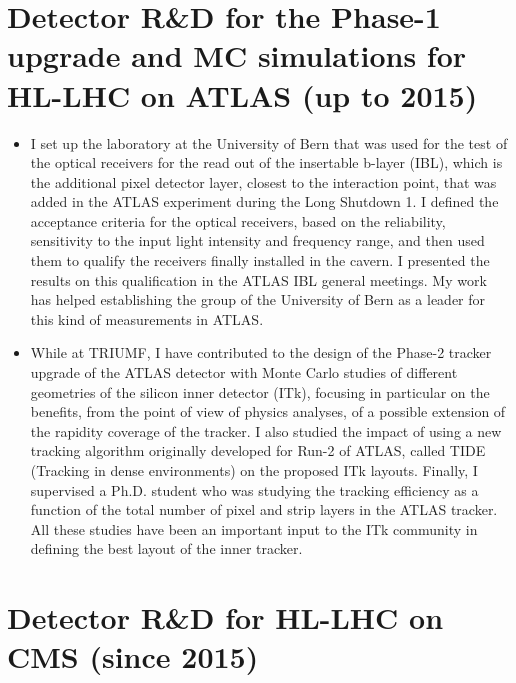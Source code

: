 \documentclass[]{cv} %
\begin{document}
\begin{resume}
\vspace{12pt}
\section{Detector R\&D for the Phase-1 upgrade and MC simulations for HL-LHC on
ATLAS (up to 2015)}

\begin{itemize}
  \item I set up the laboratory at the University of Bern that was used for the
        test of the optical receivers for the read out of the insertable b-layer
        (IBL), which is the additional pixel detector layer, closest to the
        interaction point, that was added in the ATLAS experiment during the
        Long Shutdown 1. I defined the acceptance criteria for the optical
        receivers, based on the reliability, sensitivity to the input light
        intensity and frequency range, and then used them to qualify the
        receivers finally installed in the cavern. I presented the results on
        this qualification in the ATLAS IBL general meetings. My work has helped
        establishing the group of the University of Bern as a leader for this
        kind of measurements in ATLAS.
  \item While at TRIUMF, I have contributed to the design of the Phase-2 tracker
        upgrade of the ATLAS detector with Monte Carlo studies of different
        geometries of the silicon inner detector (ITk), focusing in particular on
        the benefits, from the point of view of physics analyses, of a possible
        extension of the rapidity coverage of the tracker. I also studied the
        impact of using a new tracking algorithm originally developed for Run-2
        of ATLAS, called TIDE (Tracking in dense environments) on the proposed
        ITk layouts. Finally, I supervised a Ph.D. student who was studying the
        tracking efficiency as a function of the total number of pixel and strip
        layers in the ATLAS tracker. All these studies have been an important
        input to the ITk community in defining the best layout of the inner
        tracker.
\end{itemize}

\vspace{12pt}
\section{Detector R\&D for HL-LHC on CMS (since 2015)}


\end{resume}
\end{document}
